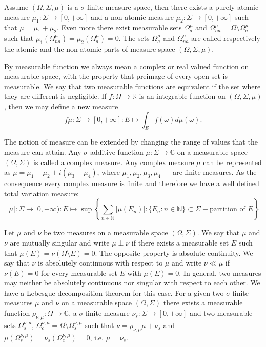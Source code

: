 Assume $(\Omega,\Sigma,\mu)$ is a $\sigma$-finite measure space, then there exists a purely atomic measure $\mu_1:\Sigma\to[0,+\infty]$ and a non atomic measure $\mu_2:\Sigma\to[0,+\infty]$ such that $\mu=\mu_1+\mu_2$. Even more there exist measurable sets $\Omega_a^{\mu}$ and $\Omega_{na}^{\mu}=\Omega\setminus \Omega_a^{\mu}$ such that $\mu_1(\Omega_{na}^{\mu})=\mu_2(\Omega_a^{\mu})=0$. The sets $\Omega_a^{\mu}$ and $\Omega_{na}^{\mu}$ are called respectively the atomic and the non atomic parts of measure space $(\Omega,\Sigma,\mu)$.

By measurable function we always mean a complex or real valued function on measurable space, with the property that preimage of every open set is measurable. We say that two measurable functions are equivalent if the set where they are different is negligible. If $f:\Omega\to\mathbb{R}$ is an  integrable function on $(\Omega,\Sigma,\mu)$, then we may define a new measure 
$$
f\mu:\Sigma\to[0,+\infty]:E\mapsto\int_{E}f(\omega)d\mu(\omega).
$$

The notion of measure can be extended by changing the range of values that the measure can attain. Any $\sigma$-additive function $\mu:\Sigma\to\mathbb{C}$ on a measurable space $(\Omega,\Sigma)$ is called a complex measure. Any complex measure $\mu$ can be represented as $\mu=\mu_1-\mu_2+i(\mu_3-\mu_4)$, where $\mu_1,\mu_2,\mu_3,\mu_4$ --- are finite measures. As the consequence every complex measure is finite and therefore we have a well defined total variation measure:
$$
|\mu|:\Sigma\to[0,+\infty):E\mapsto\sup\left\{\sum_{n\in\mathbb{N}}|\mu(E_n)|:\{E_n:n\in\mathbb{N}\}\subset\Sigma -\mbox{partition of }E\right\}
$$

Let $\mu$ and $\nu$ be two measures on a measurable space $(\Omega,\Sigma)$. We say that $\mu$ and $\nu$ are mutually singular and write $\mu\perp\nu$ if there exists a measurable set $E$ such that $\mu(E)=\nu(\Omega\setminus E)=0$. The opposite property is absolute continuity. We say that $\nu$ is absolutely continuous with respect to $\mu$ and write $\nu\ll\mu$ if $\nu(E)=0$ for every measurable set $E$ with $\mu(E)=0$. In general, two measures may neither be absolutely continuous nor singular with respect to each other. We have a Lebesgue decomposition theorem for this case. For a given two $\sigma$-finite measures $\mu$ and $\nu$ on a measurable space $(\Omega,\Sigma)$ there exists a measurable function $\rho_{\nu,\mu}:\Omega\to\mathbb{C}$, a $\sigma$-finite measure $\nu_s:\Sigma\to[0,+\infty]$ and two measurable sets $\Omega_s^{\nu,\mu}$, $\Omega_c^{\nu,\mu}=\Omega\setminus\Omega_s^{\nu,\mu}$ such that
$\nu=\rho_{\nu,\mu}\mu+\nu_s$ and $\mu(\Omega_s^{\nu,\mu})=\nu_s(\Omega_c^{\nu,\mu})=0$, i.e. $\mu\perp\nu_s$.

